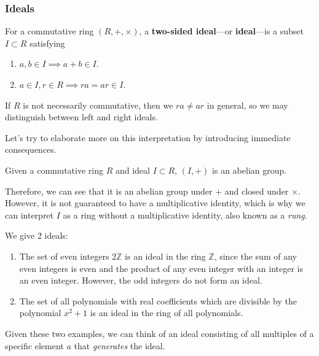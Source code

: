 \subsubsection{Ideals}

  \begin{definition}[Ideals]
    For a commutative ring $(R,+, \times)$, a \textbf{two-sided ideal}---or \textbf{ideal}---is a subset $I \subset R$ satisfying 
    \begin{enumerate}
      \item $a, b \in I \implies a + b \in I$. 
      \item $a \in I, r \in R \implies ra = ar \in I$.
    \end{enumerate}
    If $R$ is not necessarily commutative, then we $ra \neq ar$ in general, so we may distinguish between left and right ideals. 
  \end{definition}

  Let's try to elaborate more on this interpretation by introducing immediate consequences. 

  \begin{lemma}
    Given a commutative ring $R$ and ideal $I \subset R$, $(I, +)$ is an abelian group. 
  \end{lemma}

  Therefore, we can see that it is an abelian group under $+$ and closed under $\times$. However, it is not guaranteed to have a multiplicative identity, which is why we can interpret $I$ as a ring without a multiplicative identity, also known as a \textit{rung}. 

  \begin{example}
    We give 2 ideals: 
    \begin{enumerate}
      \item The set of even integers $2 \mathbb{Z}$ is an ideal in the ring $\mathbb{Z}$, since the sum of any even integers is even and the product of any even integer with an integer is an even integer. However, the odd integers do not form an ideal. 
      \item The set of all polynomials with real coefficients which are divisible by the polynomial $x^2 + 1$ is an ideal in the ring of all polynomials. 
    \end{enumerate}
  \end{example}

  Given these two examples, we can think of an ideal consisting of all multiples of a specific element $a$ that \textit{generates} the ideal. 

